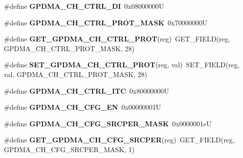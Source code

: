 \begin{DoxyCompactItemize}
\item 
\mbox{\label{group__lpc24xx__regs_gabb819905250b03e161f8a3ed2d47d4a4}} 
\#define {\bfseries G\+P\+D\+M\+A\+\_\+\+C\+H\+\_\+\+C\+T\+R\+L\+\_\+\+DI}~0x08000000U
\item 
\mbox{\label{group__lpc24xx__regs_gab4b9f7c4c22914589a0745d6b617594f}} 
\#define {\bfseries G\+P\+D\+M\+A\+\_\+\+C\+H\+\_\+\+C\+T\+R\+L\+\_\+\+P\+R\+O\+T\+\_\+\+M\+A\+SK}~0x70000000U
\item 
\mbox{\label{group__lpc24xx__regs_ga099458cc26f925c2fa9f5ab155f7c184}} 
\#define {\bfseries G\+E\+T\+\_\+\+G\+P\+D\+M\+A\+\_\+\+C\+H\+\_\+\+C\+T\+R\+L\+\_\+\+P\+R\+OT}(reg)~G\+E\+T\+\_\+\+F\+I\+E\+LD(reg, G\+P\+D\+M\+A\+\_\+\+C\+H\+\_\+\+C\+T\+R\+L\+\_\+\+P\+R\+O\+T\+\_\+\+M\+A\+SK, 28)
\item 
\mbox{\label{group__lpc24xx__regs_gab9d5d1cb623d578e404f904c9666b30e}} 
\#define {\bfseries S\+E\+T\+\_\+\+G\+P\+D\+M\+A\+\_\+\+C\+H\+\_\+\+C\+T\+R\+L\+\_\+\+P\+R\+OT}(reg,  val)~S\+E\+T\+\_\+\+F\+I\+E\+LD(reg, val, G\+P\+D\+M\+A\+\_\+\+C\+H\+\_\+\+C\+T\+R\+L\+\_\+\+P\+R\+O\+T\+\_\+\+M\+A\+SK, 28)
\item 
\mbox{\label{group__lpc24xx__regs_ga426394c1e51ab370751a7d8e2e2553ae}} 
\#define {\bfseries G\+P\+D\+M\+A\+\_\+\+C\+H\+\_\+\+C\+T\+R\+L\+\_\+\+I\+TC}~0x80000000U
\item 
\mbox{\label{group__lpc24xx__regs_gaeaf7d0bdc80d102fe4bc24253bfb27b8}} 
\#define {\bfseries G\+P\+D\+M\+A\+\_\+\+C\+H\+\_\+\+C\+F\+G\+\_\+\+EN}~0x00000001U
\item 
\mbox{\label{group__lpc24xx__regs_gaa7fbe32d42ab1757481ad5f03bcf166e}} 
\#define {\bfseries G\+P\+D\+M\+A\+\_\+\+C\+H\+\_\+\+C\+F\+G\+\_\+\+S\+R\+C\+P\+E\+R\+\_\+\+M\+A\+SK}~0x0000001eU
\item 
\mbox{\label{group__lpc24xx__regs_gabb5c00898788168473920d24a02685f1}} 
\#define {\bfseries G\+E\+T\+\_\+\+G\+P\+D\+M\+A\+\_\+\+C\+H\+\_\+\+C\+F\+G\+\_\+\+S\+R\+C\+P\+ER}(reg)~G\+E\+T\+\_\+\+F\+I\+E\+LD(reg, G\+P\+D\+M\+A\+\_\+\+C\+H\+\_\+\+C\+F\+G\+\_\+\+S\+R\+C\+P\+E\+R\+\_\+\+M\+A\+SK, 1)

\end{DoxyCompactItemize}
